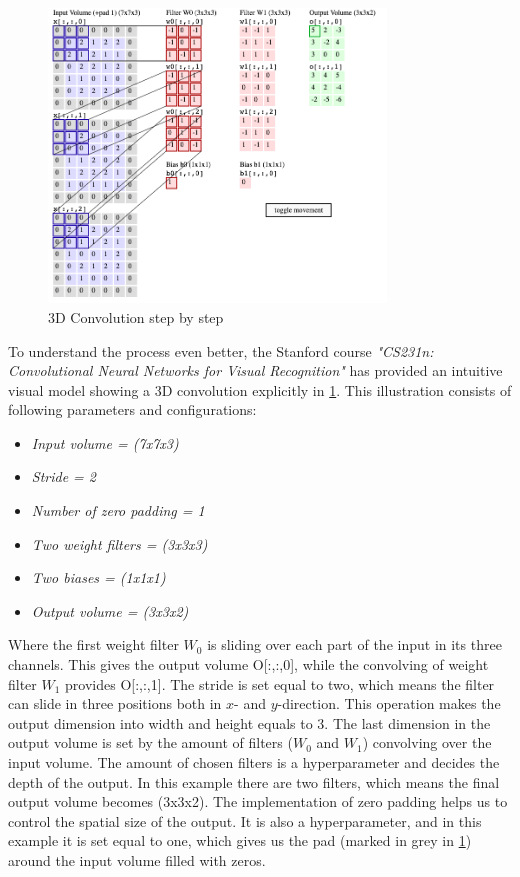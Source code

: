 \documentclass[USenglish]{ifimaster}  %
\begin{document}
\begin{figure}[ht]
    \centering
    \includegraphics[width=0.8\textwidth]{bilder/conv2.png}
    \caption{3D Convolution step by step \cite{website:cs231n}}
    \label{fig:conv}
\end{figure}
To understand the process even better, the Stanford course \textit{"CS231n: Convolutional Neural Networks for Visual Recognition"} has provided an intuitive visual model showing a 3D convolution explicitly in \cref{fig:conv}. This illustration consists of following parameters and configurations:

\begin{itemize}
    \item \textit{Input volume = (7x7x3)}
    \item \textit{Stride = 2}
    \item \textit{Number of zero padding = 1}
    \item \textit{Two weight filters = (3x3x3)}
    \item \textit{Two biases = (1x1x1)}
    \item \textit{Output volume = (3x3x2)}
\end{itemize}
Where the first weight filter $W_0$ is sliding over each part of the input in its three channels. This gives the output volume O[:,:,0], while the convolving of weight filter $W_1$ provides O[:,:,1]. The stride is set equal to two, which means the filter can slide in three positions both in $x$- and $y$-direction. This operation makes the output dimension into width and height equals to 3. The last dimension in the output volume is set by the amount of filters ($W_0$ and $W_1$) convolving over the input volume. The amount of chosen filters is a hyperparameter and decides the depth of the output. In this example there are two filters, which means the final output volume becomes (3x3x2). 
The implementation of zero padding helps us to control the spatial size of the output. It is also a hyperparameter, and in this example it is set equal to one, which gives us the pad (marked in grey in \cref{fig:conv}) around the input volume filled with zeros. 
\end{document}
